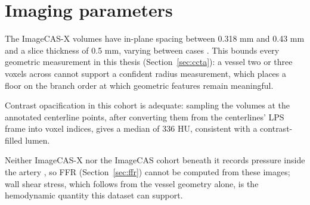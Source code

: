 
\section{Imaging parameters}
\label{sec:dataset-imaging}

The ImageCAS-X volumes have in-plane spacing between 0.318 mm and 0.43 mm and a slice thickness
of 0.5 mm, varying between cases \cite{zeng2023imagecas}.
This bounds every geometric measurement in this thesis (Section~\ref{sec:ccta}): a vessel two or
three voxels across cannot support a confident radius measurement, which places a floor on the
branch order at which geometric features remain meaningful.

Contrast opacification in this cohort is adequate: sampling the volumes at the annotated
centerline points, after converting them from the centerlines' LPS frame into voxel indices,
gives a median of 336 HU, consistent with a contrast-filled lumen.

Neither ImageCAS-X nor the ImageCAS cohort beneath it records pressure inside the artery
\cite{bransby2026imagecasx,zeng2023imagecas}, so FFR (Section~\ref{sec:ffr}) cannot be computed
from these images; wall shear stress, which follows from the vessel geometry alone, is the
hemodynamic quantity this dataset can support.
